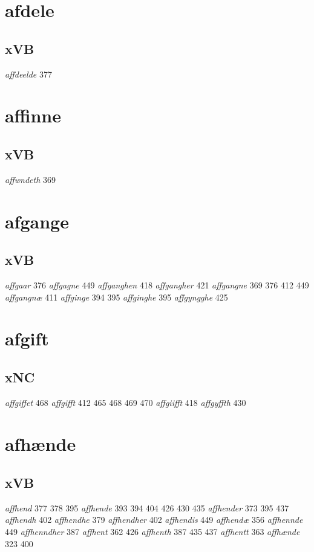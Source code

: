 \documentclass[a4paper,twocolumn]{article}
\begin{document}
\section{afdele}
\label{sec:org8f6bd29}
\subsection{xVB}
\label{sec:org40fab45}
\emph{affdeelde} 377 
\section{affinne}
\label{sec:org66f92ec}
\subsection{xVB}
\label{sec:orgb308b66}
\emph{affwndeth} 369 
\section{afgange}
\label{sec:org8f2b795}
\subsection{xVB}
\label{sec:org63617e7}
\emph{affgaar} 376 \emph{affgagne} 449 \emph{affganghen} 418 \emph{affgangher} 421 \emph{affgangne} 369 376 412 449 \emph{affgangnæ} 411 \emph{affginge} 394 395 \emph{affginghe} 395 \emph{affgyngghe} 425 
\section{afgift}
\label{sec:org540a039}
\subsection{xNC}
\label{sec:orgaad46e0}
\emph{affgiffet} 468 \emph{affgifft} 412 465 468 469 470 \emph{affgiifft} 418 \emph{affgyffth} 430 
\section{afhænde}
\label{sec:org56c485e}
\subsection{xVB}
\label{sec:orgac997a7}
\emph{affhend} 377 378 395 \emph{affhende} 393 394 404 426 430 435 \emph{affhender} 373 395 437 \emph{affhendh} 402 \emph{affhendhe} 379 \emph{affhendher} 402 \emph{affhendis} 449 \emph{affhendæ} 356 \emph{affhennde} 449 \emph{affhenndher} 387 \emph{affhent} 362 426 \emph{affhenth} 387 435 437 \emph{affhentt} 363 \emph{affhænde} 323 400 
\end{document}
